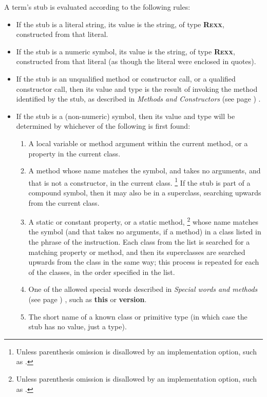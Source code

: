 A term's stub is evaluated according to the following rules:
\begin{itemize}
\item 
If the stub is a literal string, its value is the string, of
type \textbf{R\textsc{exx}}, constructed from that literal.
\item 
If the stub is a numeric symbol, its value is the string, of
type \textbf{R\textsc{exx}}, constructed from that literal (as though the
literal were enclosed in quotes).
\item 
If the stub is an unqualified method or constructor call, or a
qualified constructor call, then its value and type is the result of
invoking the method identified by the stub, as described in
 \emph{Methods and Constructors} (see page \pageref{refmethcon}) .
\item 
If the stub is a (non-numeric) symbol, then its value and type will be
determined by whichever of the following is first found:
\begin{enumerate}
\item A local variable or method argument within the current method, or a
property in the current class.
\item A method whose name matches the symbol, and takes no arguments, and
that is not a constructor, in the current class.
\footnote{
Unless parenthesis omission is disallowed by an implementation option,
such as .
}
If the stub is part of a compound symbol, then it may also be in a
superclass, searching upwards from the current class.
\item A static or constant property, or a static method,
\footnote{
Unless parenthesis omission is disallowed by an implementation option,
such as .
}
whose name matches the symbol (and that takes no arguments, if a method)
in a class listed in the  phrase of the 
instruction.
Each class from the list is searched for a matching property or method, and
then its superclasses are searched upwards from the class in the same
way; this process is repeated for each of the classes, in the order
specified in the list.
\item One of the allowed special words described in
 \emph{Special words and methods} (see page \pageref{refspecial}) , such
as \textbf{this} or \textbf{version}.
\item The short name of a known class or primitive type (in which
case the stub has no value, just a type).
\end{enumerate}

\end{itemize}
